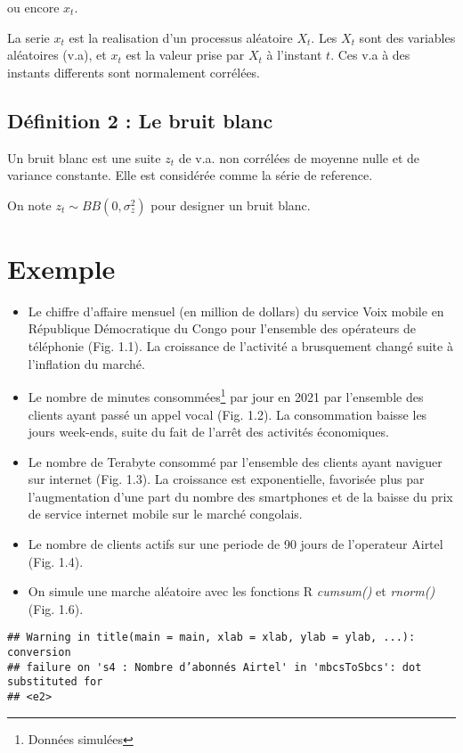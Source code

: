 \documentclass[
]{book}
\theoremstyle{definition}
\theoremstyle{definition}
\theoremstyle{definition}
\theoremstyle{definition}
\theoremstyle{remark}
\begin{document}
ou encore \(x_t\).

La serie \(x_t\) est la realisation d'un processus aléatoire \(X_t\). Les \(X_t\) sont des variables aléatoires (v.a), et \(x_t\) est la valeur prise par \(X_t\) à l'instant \(t\). Ces v.a à des instants differents sont normalement corrélées.

\hypertarget{duxe9finition-2-le-bruit-blanc}{%
\subsection{Définition 2 : Le bruit blanc}\label{duxe9finition-2-le-bruit-blanc}}

Un bruit blanc est une suite \(z_t\) de v.a. non corrélées de moyenne nulle et de variance constante. Elle est considérée comme la série de reference.

On note \(z_t \sim BB(0, \sigma_z^2)\) pour designer un bruit blanc.

\hypertarget{exemple}{%
\section{Exemple}\label{exemple}}

\begin{itemize}
\item
  Le chiffre d'affaire mensuel (en million de dollars) du service Voix mobile en République Démocratique du Congo pour l'ensemble des opérateurs de téléphonie (Fig. 1.1). La croissance de l'activité a brusquement changé suite à l'inflation du marché.
\item
  Le nombre de minutes consommées\footnote{Données simulées} par jour en 2021 par l'ensemble des clients ayant passé un appel vocal (Fig. 1.2). La consommation baisse les jours week-ends, suite du fait de l'arrêt des activités économiques.
\item
  Le nombre de Terabyte consommé par l'ensemble des clients ayant naviguer sur internet (Fig. 1.3). La croissance est exponentielle, favorisée plus par l'augmentation d'une part du nombre des smartphones et de la baisse du prix de service internet mobile sur le marché congolais.
\item
  Le nombre de clients actifs sur une periode de 90 jours de l'operateur Airtel (Fig. 1.4).
\item
  On simule une marche aléatoire avec les fonctions R \emph{cumsum()} et \emph{rnorm()} (Fig. 1.6).
\end{itemize}

\begin{verbatim}
## Warning in title(main = main, xlab = xlab, ylab = ylab, ...): conversion
## failure on 's4 : Nombre d’abonnés Airtel' in 'mbcsToSbcs': dot substituted for
## <e2>
\end{verbatim}
\end{document}
